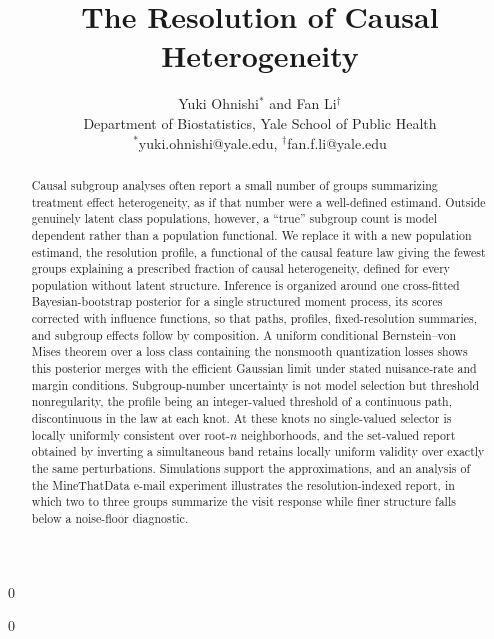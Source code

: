 \documentclass[11pt]{article}
\newcommand{\blind}{0}
\begin{document}
%

\def\spacingset#1{\renewcommand{\baselinestretch}%
{#1}\small\normalsize} \spacingset{1}



\blind
{
  \title{The Resolution of Causal Heterogeneity} %
  \author{Yuki Ohnishi$^{*}$ and Fan Li$^{\dagger}$\\
    Department of Biostatistics,  
    Yale School of Public Health\\
    $^*$yuki.ohnishi@yale.edu, 
    $^\dagger$fan.f.li@yale.edu}
  \maketitle
} \fi

\blind
{
  \bigskip
  \bigskip
  \bigskip
  \begin{center}
    {\LARGE\bf }
\end{center}
  \medskip
} \fi


\begin{abstract}
Causal subgroup analyses often report a small number of groups summarizing treatment effect heterogeneity, as if that number were a well-defined estimand. Outside genuinely latent class populations, however, a ``true'' subgroup count is model dependent rather than a population functional. We replace it with a new population estimand, the resolution profile, a functional of the causal feature law giving the fewest groups explaining a prescribed fraction of causal heterogeneity, defined for every population without latent structure. Inference is organized around one cross-fitted Bayesian-bootstrap posterior for a single structured moment process, its scores corrected with influence functions, so that paths, profiles, fixed-resolution summaries, and subgroup effects follow by composition. A uniform conditional Bernstein--von Mises theorem over a loss class containing the nonsmooth quantization losses shows this posterior merges with the efficient Gaussian limit under stated nuisance-rate and margin conditions. Subgroup-number uncertainty is not model selection but threshold nonregularity, the profile being an integer-valued threshold of a continuous path, discontinuous in the law at each knot. At these knots no single-valued selector is locally uniformly consistent over root-$n$ neighborhoods, and the set-valued report obtained by inverting a simultaneous band retains locally uniform validity over exactly the same perturbations. Simulations support the approximations, and an analysis of the MineThatData e-mail experiment illustrates the resolution-indexed report, in which two to three groups summarize the visit response while finer structure falls below a noise-floor diagnostic.
\end{abstract}
\end{document}
